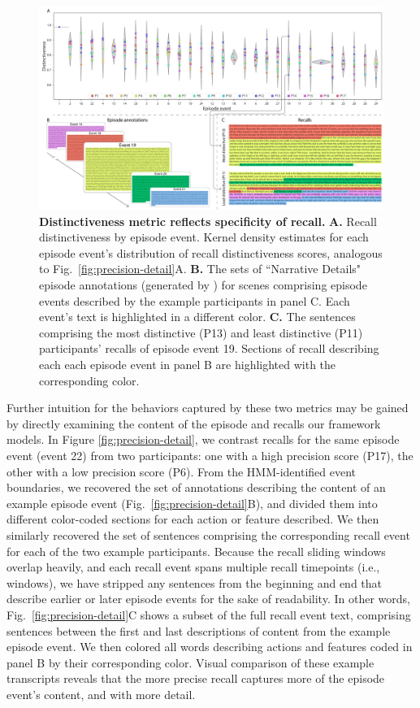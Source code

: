 \documentclass{article}
\begin{document}
\begin{figure}[t]
  \centering
  \includegraphics[width=1\textwidth]{figs/distinctiveness_detail}
  \caption{\small \textbf{Distinctiveness metric reflects specificity of recall.} \textbf{A.} Recall distinctiveness by episode event.  Kernel density estimates for each episode event's distribution of recall distinctiveness scores, analogous to Fig.~\ref{fig:precision-detail}A.  \textbf{B.} The sets of ``Narrative Details" episode annotations (generated by \citealp{ChenEtal17}) for scenes comprising episode events described by the example participants in panel C.  Each event's text is highlighted in a different color.  \textbf{C.} The sentences comprising the most distinctive (P13) and least distinctive (P11) participants' recalls of episode event 19.  Sections of recall describing each each episode event in panel B are highlighted with the corresponding color.}
  \label{fig:distinctiveness-detail}
\end{figure}

Further intuition for the behaviors captured by these two metrics may be gained by directly examining the content of the episode and recalls our framework models.  In Figure \ref{fig:precision-detail}, we contrast recalls for the same episode event (event 22) from two participants: one with a high precision score (P17), the other with a low precision score (P6).  From the HMM-identified event boundaries, we recovered the set of annotations describing the content of an example episode event (Fig.~\ref{fig:precision-detail}B), and divided them into different color-coded sections for each action or feature described.  We then similarly recovered the set of sentences comprising the corresponding recall event for each of the two example participants.  Because the recall sliding windows overlap heavily, and each recall event spans multiple recall timepoints (i.e., windows), we have stripped any sentences from the beginning and end that describe earlier or later episode events for the sake of readability.  In other words, Fig.~\ref{fig:precision-detail}C shows a subset of the full recall event text, comprising sentences between the first and last descriptions of content from the example episode event.  We then colored all words describing actions and features coded in panel B by their corresponding color.  Visual comparison of these example transcripts reveals that the more precise recall captures more of the episode event's content, and with more detail.
\end{document}
